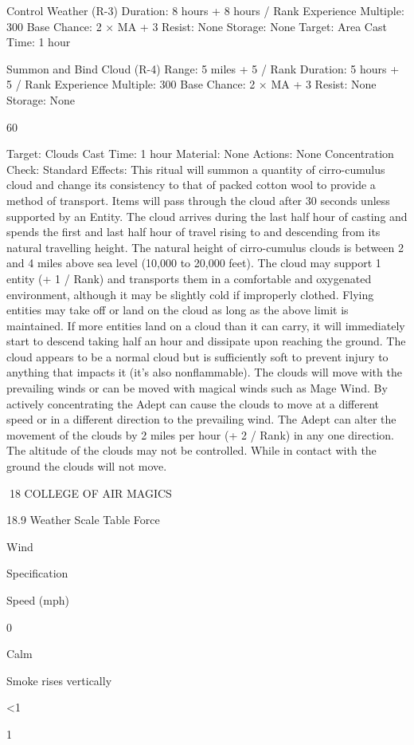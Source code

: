 \documentclass[a4paper]{article}
\begin{document}
\begin{multicols}{3}
Control Weather (R-3)
Duration: 8 hours + 8 hours / Rank
Experience Multiple: 300
Base Chance: 2 × MA + 3%
Resist: None
Storage: None
Target: Area
Cast Time: 1 hour

Summon and Bind Cloud (R-4)
Range: 5 miles + 5 / Rank
Duration: 5 hours + 5 / Rank
Experience Multiple: 300
Base Chance: 2 × MA + 3%
Resist: None
Storage: None

60

Target: Clouds
Cast Time: 1 hour
Material: None
Actions: None
Concentration Check: Standard
Effects: This ritual will summon a quantity of
cirro-cumulus cloud and change its consistency to
that of packed cotton wool to provide a method of
transport. Items will pass through the cloud after
30 seconds unless supported by an Entity. The
cloud arrives during the last half hour of casting
and spends the first and last half hour of travel
rising to and descending from its natural travelling
height. The natural height of cirro-cumulus clouds
is between 2 and 4 miles above sea level (10,000 to
20,000 feet). The cloud may support 1 entity (+ 1 /
Rank) and transports them in a comfortable and
oxygenated environment, although it may be
slightly cold if improperly clothed. Flying entities
may take off or land on the cloud as long as the
above limit is maintained. If more entities land on a
cloud than it can carry, it will immediately start to
descend taking half an hour and dissipate upon
reaching the ground. The cloud appears to be a
normal cloud but is sufficiently soft to prevent
injury to anything that impacts it (it’s also nonflammable). The clouds will move with the prevailing winds or can be moved with magical winds
such as Mage Wind. By actively concentrating the
Adept can cause the clouds to move at a different
speed or in a different direction to the prevailing
wind. The Adept can alter the movement of the
clouds by 2 miles per hour (+ 2 / Rank) in any one
direction. The altitude of the clouds may not be
controlled. While in contact with the ground the
clouds will not move.

18 COLLEGE OF AIR MAGICS

18.9 Weather Scale Table
Force

Wind

Specification

Speed (mph)

0

Calm

Smoke rises vertically

<1

1


\end{multicols}
\end{document}
